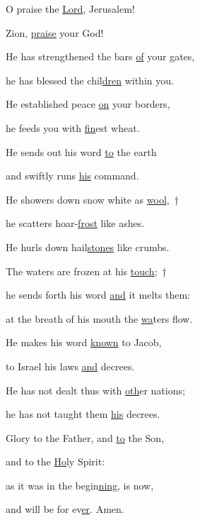 \noindent O praise the \uline{Lord}, Jerusalem!~\GreStar{}~\nopagebreak

Zion, \uline{praise} your God!

\noindent He has strengthened the bars \uline{of} your gates,~\GreStar{}~\nopagebreak

he has blessed the chil\uline{dren} within you.

\noindent He established peace \uline{on} your borders,~\GreStar{}~\nopagebreak

he feeds you with \uline{fin}est wheat.

\noindent He sends out his word \uline{to} the earth~\GreStar{}~\nopagebreak

and swiftly runs \uline{his} command.

\noindent He showers down snow white as \uline{wool},~†~\nopagebreak

he scatters hoar-\uline{frost} like ashes.

He hurls down hail\uline{stones} like crumbs.

\noindent The waters are frozen at his \uline{touch};~†~\nopagebreak

he sends forth his word \uline{and} it melts them:~\GreStar{}~\nopagebreak

at the breath of his mouth the \uline{wa}ters flow.

\noindent He makes his word \uline{known} to Jacob,~\GreStar{}~\nopagebreak

to Israel his laws \uline{and} decrees.

\noindent He has not dealt thus with \uline{oth}er nations;~\GreStar{}~\nopagebreak

he has not taught them \uline{his} decrees.

\noindent Glory to the Father, and \uline{to} the Son,~\GreStar{}~\nopagebreak

and to the \uline{Ho}ly Spirit:

\noindent as it was in the begin\uline{ning}, is now,~\GreStar{}~\nopagebreak

and will be for ev\uline{er}. Amen.
